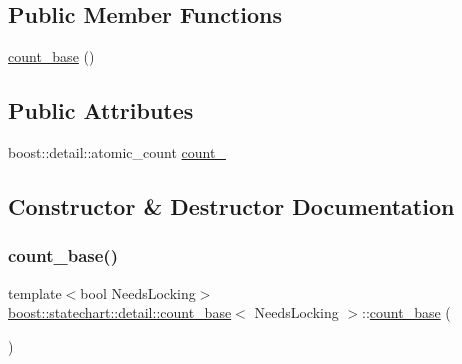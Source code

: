 \subsection*{Public Member Functions}
\begin{DoxyCompactItemize}
\item 
\mbox{\hyperlink{structboost_1_1statechart_1_1detail_1_1count__base_acc4715a7b9aba3a55dd8e2e4e0f701dc}{count\+\_\+base}} ()
\end{DoxyCompactItemize}
\subsection*{Public Attributes}
\begin{DoxyCompactItemize}
\item 
boost\+::detail\+::atomic\+\_\+count \mbox{\hyperlink{structboost_1_1statechart_1_1detail_1_1count__base_adc3f06d7b2306b350738229905fb9b10}{count\+\_\+}}
\end{DoxyCompactItemize}


\subsection{Constructor \& Destructor Documentation}
\mbox{\label{structboost_1_1statechart_1_1detail_1_1count__base_acc4715a7b9aba3a55dd8e2e4e0f701dc}} 
\subsubsection{\texorpdfstring{count\+\_\+base()}{count\_base()}}
{\footnotesize\ttfamily template$<$bool Needs\+Locking$>$ \\
\mbox{\hyperlink{structboost_1_1statechart_1_1detail_1_1count__base}{boost\+::statechart\+::detail\+::count\+\_\+base}}$<$ Needs\+Locking $>$\+::\mbox{\hyperlink{structboost_1_1statechart_1_1detail_1_1count__base}{count\+\_\+base}} (\begin{DoxyParamCaption}{ }\end{DoxyParamCaption})\hspace{0.3cm}{\ttfamily [inline]}}




